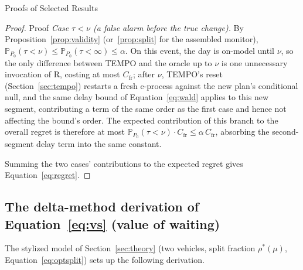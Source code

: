 \documentclass[trsc,dblanonrev]{informs4}
\newcommand{\Prob}{\mathbb{P}}
\newcommand{\Rmax}{\mathrm{R}}
\begin{document}
\begin{APPENDIX}{Proofs of Selected Results}
\begin{proof}{Proof}
\emph{Case $\tau < \nu$ (a false alarm before the true change).} By
Proposition~\ref{prop:validity} (or~\ref{prop:split} for the assembled
monitor), $\Prob_{P_0}(\tau < \nu) \le \Prob_{P_0}(\tau < \infty) \le
\alpha$. On this event, the day is on-model until $\nu$, so the only
difference between TEMPO and the oracle up to $\nu$ is one unnecessary
invocation of $\Rmax$, costing at most $C_{\mathrm{fr}}$; after $\nu$,
TEMPO's reset (Section~\ref{sec:tempo}) restarts a fresh e-process
against the new plan's conditional null, and the same delay bound of
Equation~\eqref{eq:wald} applies to this new segment, contributing a
term of the same order as the first case and hence not affecting the
bound's order. The expected contribution of this branch to the overall
regret is therefore at most $\Prob_{P_0}(\tau < \nu) \cdot
C_{\mathrm{fr}} \le \alpha\, C_{\mathrm{fr}}$, absorbing the
second-segment delay term into the same constant.

Summing the two cases' contributions to the expected regret gives
Equation~\eqref{eq:regret}. \Halmos
\end{proof}

\subsection{The delta-method derivation of Equation~\eqref{eq:vs} (value of waiting)}

The stylized model of Section~\ref{sec:theory} (two vehicles, split
fraction $\rho^\ast(\mu)$, Equation~\eqref{eq:optsplit}) sets up the
following derivation.


\end{APPENDIX}
\end{document}
